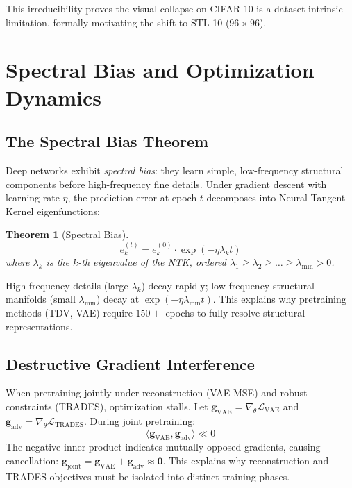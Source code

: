 \documentclass[12pt,a4paper]{article}
\newtheorem{theorem}{Theorem}[section]
\begin{document}
This irreducibility proves the visual collapse on CIFAR-10 is a
dataset-intrinsic limitation, formally motivating the shift to STL-10
($96{\times}96$).


\section{Spectral Bias and Optimization Dynamics}
\label{app:spectral}

\subsection{The Spectral Bias Theorem}

Deep networks exhibit \textit{spectral bias}: they learn simple,
low-frequency structural components before high-frequency fine details.
Under gradient descent with learning rate $\eta$, the prediction error
at epoch $t$ decomposes into Neural Tangent Kernel eigenfunctions:

\begin{theorem}[Spectral Bias]
\begin{equation}
  e_k^{(t)} = e_k^{(0)} \cdot \exp\left( -\eta \lambda_k t \right)
\end{equation}
where $\lambda_k$ is the $k$-th eigenvalue of the NTK, ordered
$\lambda_1 \ge \lambda_2 \ge \dots \ge \lambda_{\min} > 0$.
\end{theorem}

High-frequency details (large $\lambda_k$) decay rapidly; low-frequency
structural manifolds (small $\lambda_{\min}$) decay at
$\exp(-\eta \lambda_{\min} t)$. This explains why pretraining methods
(TDV, VAE) require $150+$ epochs to fully resolve structural
representations.

\subsection{Destructive Gradient Interference}

When pretraining jointly under reconstruction (VAE MSE) and robust
constraints (TRADES), optimization stalls. Let
$\mathbf{g}_{\text{VAE}} = \nabla_\theta \mathcal{L}_{\text{VAE}}$
and $\mathbf{g}_{\text{adv}} = \nabla_\theta \mathcal{L}_{\text{TRADES}}$.
During joint pretraining:
\begin{equation}
  \langle \mathbf{g}_{\text{VAE}}, \mathbf{g}_{\text{adv}} \rangle \ll 0
\end{equation}
The negative inner product indicates mutually opposed gradients, causing
cancellation:
$\mathbf{g}_{\text{joint}} = \mathbf{g}_{\text{VAE}} +
\mathbf{g}_{\text{adv}} \approx \mathbf{0}$.
This explains why reconstruction and TRADES objectives must be isolated
into distinct training phases.
\end{document}

